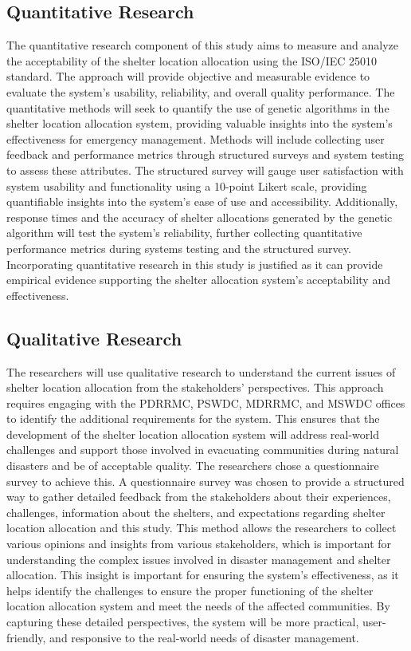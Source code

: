 \subsection{Quantitative Research}
	The quantitative research component of this study aims to measure and analyze the acceptability of the shelter location allocation using the ISO/IEC 25010 standard. The approach will provide objective and measurable evidence to evaluate the system's usability, reliability, and overall quality performance. The quantitative methods will seek to quantify the use of genetic algorithms in the shelter location allocation system, providing valuable insights into the system's effectiveness for emergency management.
	Methods will include collecting user feedback and performance metrics through structured surveys and system testing to assess these attributes. The structured survey will gauge user satisfaction with system usability and functionality using a 10-point Likert scale, providing quantifiable insights into the system's ease of use and accessibility. Additionally, response times and the accuracy of shelter allocations generated by the genetic algorithm will test the system's reliability, further collecting quantitative performance metrics during systems testing and the structured survey.
	Incorporating quantitative research in this study is justified as it can provide empirical evidence supporting the shelter allocation system's acceptability and effectiveness. 

\subsection{Qualitative Research}
	The researchers will use qualitative research to understand the current issues of shelter location allocation from the stakeholders' perspectives. This approach requires engaging with the PDRRMC, PSWDC, MDRRMC, and MSWDC offices to identify the additional requirements for the system. This ensures that the development of the shelter location allocation system will address real-world challenges and support those involved in evacuating communities during natural disasters and be of acceptable quality.
	The researchers chose a questionnaire survey to achieve this. A questionnaire survey was chosen to provide a structured way to gather detailed feedback from the stakeholders about their experiences, challenges, information about the shelters, and expectations regarding shelter location allocation and this study. This method allows the researchers to collect various opinions and insights from various stakeholders, which is important for understanding the complex issues involved in disaster management and shelter allocation.
	This insight is important for ensuring the system's effectiveness, as it helps identify the challenges to ensure the proper functioning of the shelter location allocation system and meet the needs of the affected communities. By capturing these detailed perspectives, the system will be more practical, user-friendly, and responsive to the real-world needs of disaster management.

